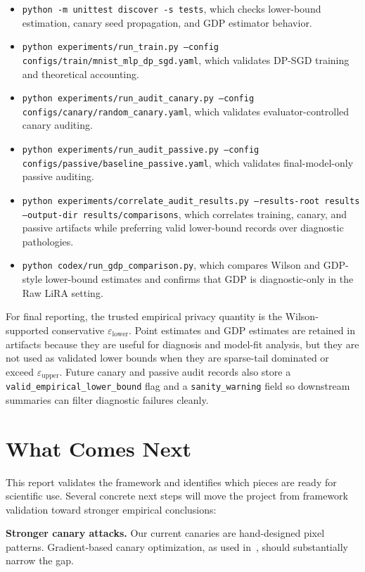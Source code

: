 \documentclass{article}
\begin{document}
\begin{itemize}
    \item \texttt{python -m unittest discover -s tests}, which checks lower-bound estimation, canary seed propagation, and GDP estimator behavior.
    \item \texttt{python experiments/run\_train.py --config configs/train/mnist\_mlp\_dp\_sgd.yaml}, which validates DP-SGD training and theoretical accounting.
    \item \texttt{python experiments/run\_audit\_canary.py --config configs/canary/random\_canary.yaml}, which validates evaluator-controlled canary auditing.
    \item \texttt{python experiments/run\_audit\_passive.py --config configs/passive/baseline\_passive.yaml}, which validates final-model-only passive auditing.
    \item \texttt{python experiments/correlate\_audit\_results.py --results-root results --output-dir results/comparisons}, which correlates training, canary, and passive artifacts while preferring valid lower-bound records over diagnostic pathologies.
    \item \texttt{python codex/run\_gdp\_comparison.py}, which compares Wilson and GDP-style lower-bound estimates and confirms that GDP is diagnostic-only in the Raw LiRA setting.
\end{itemize}

For final reporting, the trusted empirical privacy quantity is the Wilson-supported conservative $\varepsilon_{\text{lower}}$. Point estimates and GDP estimates are retained in artifacts because they are useful for diagnosis and model-fit analysis, but they are not used as validated lower bounds when they are sparse-tail dominated or exceed $\varepsilon_{\text{upper}}$. Future canary and passive audit records also store a \texttt{valid\_empirical\_lower\_bound} flag and a \texttt{sanity\_warning} field so downstream summaries can filter diagnostic failures cleanly.

\section{What Comes Next}

This report validates the framework and identifies which pieces are ready for scientific use. Several concrete next steps will move the project from framework validation toward stronger empirical conclusions:

\textbf{Stronger canary attacks.} Our current canaries are hand-designed pixel patterns. Gradient-based canary optimization, as used in~\citep{nasr2023tight, steinke2023privacy}, should substantially narrow the gap.
\end{document}
